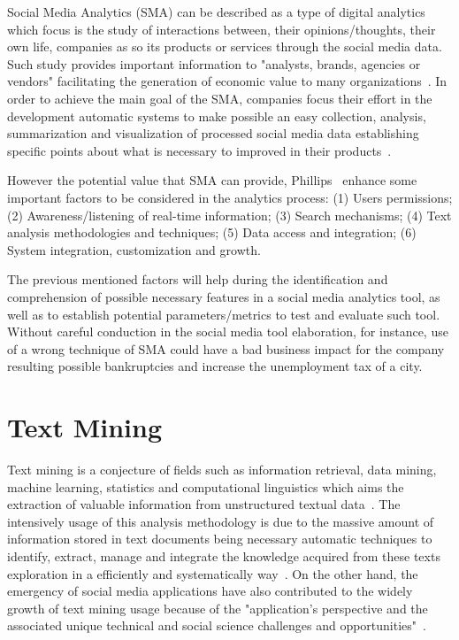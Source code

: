 Social Media Analytics (SMA) can be described as a type of digital analytics which focus is the study of interactions between, their opinions/thoughts, their own life, companies as so its products or services through the social media data. Such study provides important information to "analysts, brands, agencies or vendors" facilitating the generation of economic value to many organizations~\cite{kn:Judah2012}. In order to achieve the main goal of the SMA, companies focus their effort in the development automatic systems to make possible an easy collection, analysis, summarization and visualization of processed social media data establishing specific points about what is necessary to improved in their products~\cite{zeng2010social}.

However the potential value that SMA can provide, Phillips~\cite{kn:Judah2012} enhance some important factors to be considered in the analytics process: (1) Users permissions; (2) Awareness/listening of real-time information; (3) Search mechanisms; (4) Text analysis methodologies and techniques; (5) Data access and integration; (6) System integration, customization and growth.

The previous mentioned factors will help during the identification and comprehension of possible necessary features in a social media analytics tool, as well as to establish potential parameters/metrics to test and evaluate such tool. Without careful conduction in the social media tool elaboration, for instance, use of a wrong technique of SMA could have a bad business impact for the company resulting possible bankruptcies and increase the unemployment tax of a city.


\section{Text Mining}

Text mining is a conjecture of fields such as information retrieval, data mining, machine learning, statistics and computational linguistics which aims the extraction of valuable information from unstructured textual data~\cite{kn:He2013}. The intensively usage of this analysis methodology is due to the massive amount of information stored in text documents being necessary automatic techniques to identify, extract, manage and integrate the knowledge acquired from these texts exploration in a efficiently and systematically way~\cite{ananiadou2015textmining}. On the other hand, the emergency of social media applications have also contributed to the widely growth of text mining usage because of the "application’s perspective and the associated unique technical and social science challenges and opportunities"~\cite{zeng2010social}.

